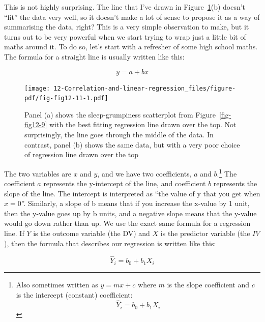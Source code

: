 \documentclass[
  a4paper,
]{book}
\begin{document}
This is not highly surprising. The line that I've drawn in
Figure~\ref{fig-fig12-11}(b) doesn't ``fit'' the data very well, so it
doesn't make a lot of sense to propose it as a way of summarising the
data, right? This is a very simple observation to make, but it turns out
to be very powerful when we start trying to wrap just a little bit of
maths around it. To do so, let's start with a refresher of some high
school maths. The formula for a straight line is usually written like
this:

\[y=a+bx\]

\begin{figure}[H]

\texttt{[image: 12-Correlation-and-linear-regression\_files/figure-pdf/fig-fig12-11-1.pdf]} \hfill{}

\caption{\label{fig-fig12-11}Panel (a) shows the sleep-grumpiness
scatterplot from Figure~\ref{fig-fig12-9} with the best fitting
regression line drawn over the top. Not surprisingly, the line goes
through the middle of the data. In contrast, panel (b) shows the same
data, but with a very poor choice of regression line drawn over the top}

\end{figure}

The two variables are \(x\) and \(y\), and we have two coefficients,
\(a\) and \(b\).\footnote{Also sometimes written as \(y = mx + c\) where
  \(m\) is the slope coefficient and \(c\) is the intercept (constant)
  coefficient: \[\hat{Y}_i=b_0+b_1X_i\]} The coefficient \(a\)
represents the y-intercept of the line, and coefficient \(b\) represents
the slope of the line. The intercept is interpreted as ``the value of y
that you get when \(x = 0\)''. Similarly, a slope of b means that if you
increase the x-value by 1 unit, then the y-value goes up by b units, and
a negative slope means that the y-value would go down rather than up. We
use the exact same formula for a regression line. If \(Y\) is the
outcome variable (the DV) and \(X\) is the predictor variable (the
\(IV\)), then the formula that describes our regression is written like
this:

\[\hat{Y}_i=b_0+b_1X_i\]
\end{document}

